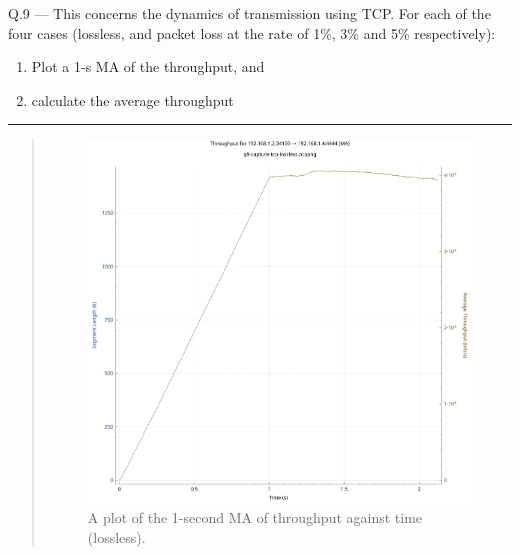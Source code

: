 \documentclass{article}
\newcommand\Que[2]{%
\begin{samepage}
\leavevmode\par
\noindent
Q.#1 --- #2\par\vspace{10pt}\hrule\vspace{10pt}
\end{samepage}}
\newenvironment{ans}
{\fbox{Answer}\begin{quote}\nopagebreak}
{\end{quote}}
\begin{document}
\Que{9}{
This concerns the dynamics of transmission using TCP. For each
of the four cases (lossless, and packet loss at the rate of 1\%,
3\% and 5\% respectively):
\begin{enumerate}
\item Plot a 1-s MA of the throughput, and
\item calculate the average throughput
\end{enumerate}}
\begin{ans}

\begin{figure}[H]
\centering
\includegraphics[width=16cm]{data/q9-1msav-throughput.pdf}
\caption{A plot of the 1-second MA of throughput against time
(lossless).}
\label{fig:tcp-lossless}
\end{figure}


\end{ans}
\end{document}
